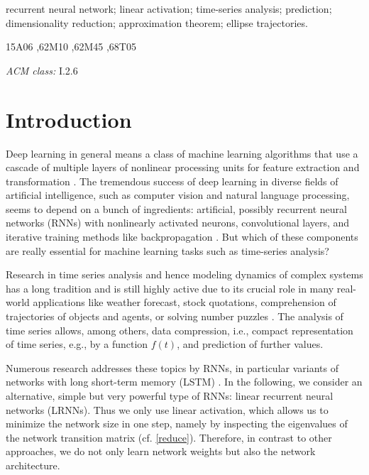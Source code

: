 \documentclass[preprint,12pt,times,authoryear]{elsarticle}%
\theoremstyle{definition}
\begin{document}
\begin{frontmatter}
\begin{keyword}
recurrent neural network; linear activation; time-series analysis; prediction;
dimensionality reduction; approximation theorem; ellipse trajectories.

\MSC[2010] 15A06 %
\sep 62M10 %
\sep 62M45 %
\sep 68T05 %

\emph{ACM class:} I.2.6 %
\end{keyword}

\end{frontmatter}


\section{Introduction}

Deep learning in general means a class of machine learning algorithms that use a
cascade of multiple layers of nonlinear processing units for feature extraction
and transformation \citep{DY14}. The tremendous success of deep learning in
diverse fields of artificial intelligence, such as computer vision and natural
language processing, seems to depend on a bunch of ingredients: artificial,
possibly recurrent neural networks (RNNs) with nonlinearly activated neurons,
convolutional layers, and iterative training methods like backpropagation
\citep{GBC16}. But which of these components are really essential for machine
learning tasks such as time-series analysis?

Research in time series analysis and hence modeling dynamics of complex systems
has a long tradition and is still highly active due to its crucial role in many
real-world applications \citep{LBE15} like weather forecast, stock quotations,
comprehension of trajectories of objects and agents, or solving number puzzles
\citep{RK11,GW13}. The analysis of time series allows, among others, data
compression, i.e., compact representation of time series, e.g., by a function
$f(t)$, and prediction of further values.

Numerous research addresses these topics by RNNs, in particular variants of
networks with long short-term memory (LSTM) \citep{HS97}. In the following, we
consider an alternative, simple but very powerful type of RNNs: linear
recurrent neural networks (LRNNs). Thus we only use linear activation, which
allows us to minimize the network size in one step, namely by inspecting the
eigenvalues of the network transition matrix (cf. \cref{reduce}). Therefore, in
contrast to other approaches, we do not only learn network weights but also the
network architecture.
\end{document}
